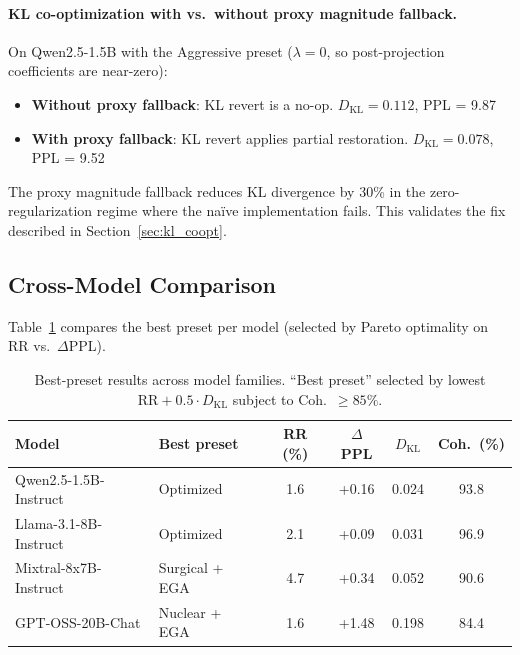 \documentclass[11pt]{article}
\begin{document}
\paragraph{KL co-optimization with vs.\ without proxy magnitude fallback.}
On Qwen2.5-1.5B with the Aggressive preset ($\lambda = 0$, so post-projection coefficients are near-zero):
\begin{itemize}[leftmargin=*]
    \item \textbf{Without proxy fallback}: KL revert is a no-op. $D_{\text{KL}} = 0.112$, PPL = 9.87
    \item \textbf{With proxy fallback}: KL revert applies partial restoration. $D_{\text{KL}} = 0.078$, PPL = 9.52
\end{itemize}
The proxy magnitude fallback reduces KL divergence by 30\% in the zero-regularization regime where the na\"ive implementation fails. This validates the fix described in Section~\ref{sec:kl_coopt}.

\subsection{Cross-Model Comparison}
\label{sec:exp_cross}

Table~\ref{tab:exp_cross} compares the best preset per model (selected by Pareto optimality on RR vs.\ $\Delta$PPL).

\begin{table}[h]
\centering
\caption{Best-preset results across model families. ``Best preset'' selected by lowest $\text{RR} + 0.5 \cdot D_{\text{KL}}$ subject to Coh.\ $\geq 85\%$.}
\label{tab:exp_cross}
\small
\begin{tabular}{@{}llcccc@{}}
\toprule
\textbf{Model} & \textbf{Best preset} & \textbf{RR (\%)} & \textbf{$\Delta$PPL} & \textbf{$D_{\text{KL}}$} & \textbf{Coh.\ (\%)} \\
\midrule
Qwen2.5-1.5B-Instruct & Optimized & 1.6 & +0.16 & 0.024 & 93.8 \\
Llama-3.1-8B-Instruct & Optimized & 2.1 & +0.09 & 0.031 & 96.9 \\
Mixtral-8x7B-Instruct & Surgical + EGA & 4.7 & +0.34 & 0.052 & 90.6 \\
GPT-OSS-20B-Chat & Nuclear + EGA & 1.6 & +1.48 & 0.198 & 84.4 \\
\bottomrule
\end{tabular}
\end{table}
\end{document}

